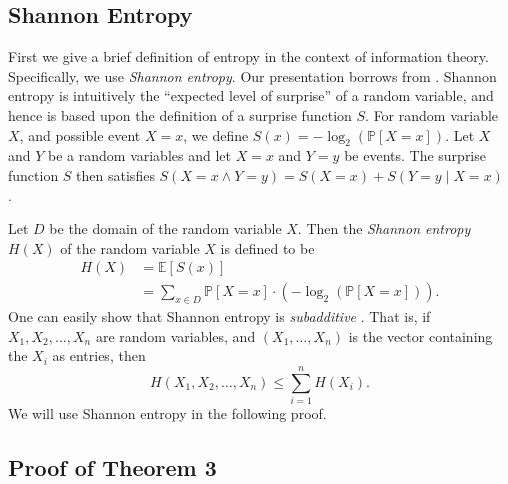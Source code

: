 \documentclass[12pt, a4paper]{article}
\begin{document}
\subsection{Shannon Entropy}\label{ssec:shannonEntropy}
First we give a brief definition of entropy in the context of information theory. Specifically, we use \textit{Shannon entropy}. Our presentation %
 borrows from \cite{DG14}. Shannon entropy is intuitively the ``expected level of surprise'' of a random variable, and hence is based upon the definition of a surprise function $S$. For random variable $X$, and possible event $X=x$, we define $S(x)=-\log_2(\mathbb{P}[X=x])$. Let $X$ and $Y$ be a random variables and let $X=x$ and $Y=y$ be events. The surprise function $S$ then satisfies $S(X=x\land Y=y) = S(X=x) + S(Y=y\mid X=x)$ \cite{DG14}.
 
Let $D$ be the domain of the random variable $X$. Then the \textit{Shannon entropy} $H(X)$ of the random variable $X$ is defined to be
\begin{align*}
	H(X)
	& = \mathbb{E}[S(x)]\\
	& = \sum_{x\in D}\mathbb{P}[X=x]\cdot (-\log_2(\mathbb{P}[X=x])).
\end{align*}
One can easily show that Shannon entropy is \textit{subadditive} \cite{DG14}. That is, if $X_1, X_2, \ldots, X_n$ are random variables, and $(X_1,\dots,X_n)$ is the vector containing the $X_i$ as entries, then
	\begin{equation}\label{subadditivityDefinition}
			H(X_1, X_2, \ldots, X_n)\le \sum_{i=1}^{n}H(X_i).
	\end{equation}
We will use Shannon entropy in the following proof.

\subsection{Proof of Theorem 3}
\end{document}

